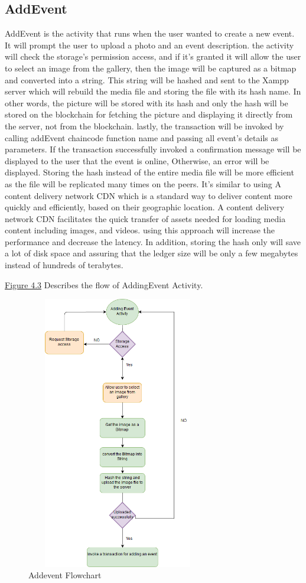 \subsection{AddEvent}
AddEvent is the activity that runs when the user wanted to create a new event. It will prompt the user to upload a photo and an event description. the activity will check the storage's permission access, and if it's granted it will allow the user to select an image from the gallery, then the image will be captured as a bitmap and converted into a string. This string will be hashed and sent to the Xampp server which will rebuild the media file and storing the file with its hash name. In other words, the picture will be stored with its hash and only the hash will be stored on the blockchain for fetching the picture and displaying it directly from the server, not from the blockchain. lastly, the transaction will be invoked by calling addEvent chaincode function name and passing all event's details as parameters.
If the transaction successfully invoked a confirmation message will be displayed to the user that the event is online, Otherwise, an error will be displayed. 
 Storing the hash instead of the entire media file will be more efficient as the file will be replicated many times on the peers.
It's similar to using A content delivery network CDN which is a standard way to deliver content more quickly and efficiently, based on their geographic location. A content delivery network CDN facilitates the quick transfer of assets needed for loading media content including images, and videos. using this approach will increase the performance and decrease the latency. In addition, storing the hash only will save a lot of disk space and assuring that the ledger size will be only a few megabytes instead of hundreds of terabytes. 
   
\hyperref[fig:mainactivityflow]{Figure 4.3} Describes the flow of AddingEvent Activity. 
 \begin{figure}[H]
\center
\includegraphics[width=8cm,height=12cm]{images/addingeventflowchart.png}
\caption{Addevent Flowchart}
\label{fig:addingeventflowchart}
\end{figure}

